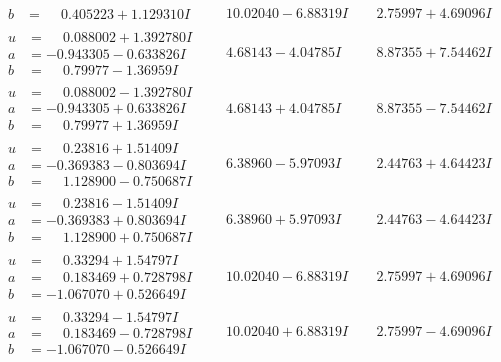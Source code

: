 \documentclass[1p]{elsarticle_modified}
\theoremstyle{definition}
\begin{document}
$$\begin{array}{c|c|c}
\begin{aligned}
b &= \phantom{-}0.405223 + 1.129310 I\end{aligned}
 & \phantom{-}10.02040 - 6.88319 I & \phantom{-}2.75997 + 4.69096 I \\ \hline\begin{aligned}
u &= \phantom{-}0.088002 + 1.392780 I \\
a &= -0.943305 - 0.633826 I \\
b &= \phantom{-}0.79977 - 1.36959 I\end{aligned}
 & \phantom{-}4.68143 - 4.04785 I & \phantom{-}8.87355 + 7.54462 I \\ \hline\begin{aligned}
u &= \phantom{-}0.088002 - 1.392780 I \\
a &= -0.943305 + 0.633826 I \\
b &= \phantom{-}0.79977 + 1.36959 I\end{aligned}
 & \phantom{-}4.68143 + 4.04785 I & \phantom{-}8.87355 - 7.54462 I \\ \hline\begin{aligned}
u &= \phantom{-}0.23816 + 1.51409 I \\
a &= -0.369383 - 0.803694 I \\
b &= \phantom{-}1.128900 - 0.750687 I\end{aligned}
 & \phantom{-}6.38960 - 5.97093 I & \phantom{-}2.44763 + 4.64423 I \\ \hline\begin{aligned}
u &= \phantom{-}0.23816 - 1.51409 I \\
a &= -0.369383 + 0.803694 I \\
b &= \phantom{-}1.128900 + 0.750687 I\end{aligned}
 & \phantom{-}6.38960 + 5.97093 I & \phantom{-}2.44763 - 4.64423 I \\ \hline\begin{aligned}
u &= \phantom{-}0.33294 + 1.54797 I \\
a &= \phantom{-}0.183469 + 0.728798 I \\
b &= -1.067070 + 0.526649 I\end{aligned}
 & \phantom{-}10.02040 - 6.88319 I & \phantom{-}2.75997 + 4.69096 I \\ \hline\begin{aligned}
u &= \phantom{-}0.33294 - 1.54797 I \\
a &= \phantom{-}0.183469 - 0.728798 I \\
b &= -1.067070 - 0.526649 I\end{aligned}
 & \phantom{-}10.02040 + 6.88319 I & \phantom{-}2.75997 - 4.69096 I \\ \hline\begin{aligned}

\end{aligned}
\end{array}$$
\end{document}
